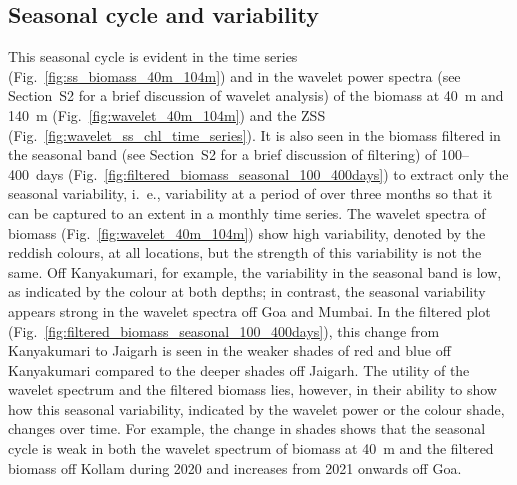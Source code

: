 \documentclass[authoryear,review,11pt]{elsarticle}
\newcommand{\chla}{chl-{\emph{a}}}
\begin{document}
%


\subsection{Seasonal cycle and variability}
\label{sec:seasonal.zss}

This seasonal cycle is evident in the time series (Fig.~\ref{fig:ss_biomass_40m_104m}) and in the wavelet power spectra (see Section~S2 for a brief discussion of wavelet analysis) of the biomass at 40~m and 140~m (Fig.~\ref{fig:wavelet_40m_104m}) and the ZSS (Fig.~\ref{fig:wavelet_ss_chl_time_series}).  It is also seen in the biomass filtered in the seasonal band (see Section~S2 for a brief discussion of filtering) of 100--400~days (Fig.~\ref{fig:filtered_biomass_seasonal_100_400days}) to extract only the seasonal variability, i.~e., variability at a period of over three months so that it can be captured to an extent in a monthly time series.  The wavelet spectra of biomass (Fig.~\ref{fig:wavelet_40m_104m}) show high variability, denoted by the reddish colours, at all locations, but the strength of this variability is not the same.  Off Kanyakumari, for example, the variability in the seasonal band is low, as indicated by the colour at both depths; in contrast, the seasonal variability appears strong in the wavelet spectra off Goa and Mumbai.  In the filtered plot (Fig.~\ref{fig:filtered_biomass_seasonal_100_400days}), this change from Kanyakumari to Jaigarh is seen in the weaker shades of red and blue off Kanyakumari compared to the deeper shades off Jaigarh. The utility of the wavelet spectrum and the filtered biomass lies, however, in their ability to show how this seasonal variability, indicated by the wavelet power or the colour shade, changes over time.  For example, the change in shades shows that the seasonal cycle is weak in both the wavelet spectrum of biomass at 40~m and the filtered biomass off Kollam during 2020 and increases from 2021 onwards off Goa. 
\end{document}
